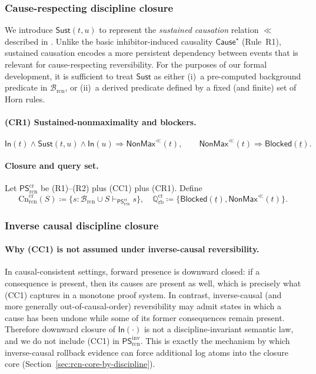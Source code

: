 \documentclass[twoside]{article}
\newcommand{\Cn}{\mathrm{Cn}}
\newcommand{\1}{\mathbf{1}}
\begin{document}
\subsubsection{Cause-respecting discipline closure}
\label{sec:rcn-cause-respecting-closure}

We introduce \(\mathsf{Sust}(t,u)\) to represent the \emph{sustained causation} relation \(\ll\) described in \cite{melgratti2024reversible}.
Unlike the basic inhibitor-induced causality \(\mathsf{Cause}^\star\) (Rule~R1), sustained causation encodes a more persistent dependency between events that is relevant for cause-respecting reversibility.
For the purposes of our formal development, it is sufficient to treat \(\mathsf{Sust}\) as either
(i)~a pre-computed background predicate in \(\mathcal{B}_{\mathrm{rcn}}\), or
(ii)~a derived predicate defined by a fixed (and finite) set of Horn rules.

\paragraph{(CR1) Sustained-nonmaximality and blockers.}
\[
\mathsf{In}(t)\wedge \mathsf{Sust}(t,u)\wedge \mathsf{In}(u)\Rightarrow \mathsf{NonMax}^{\ll}(t),
\qquad
\mathsf{NonMax}^{\ll}(t)\Rightarrow \mathsf{Blocked}(\underline{t}).
\]

\paragraph{Closure and query set.}
Let \(\mathsf{PS}^{\mathrm{cr}}_{\mathrm{rcn}}\) be (R1)--(R2) plus (CC1) plus (CR1).
Define
\[
\Cn^{\mathrm{cr}}_{\mathrm{rcn}}(S)\coloneqq \{s:\mathcal{B}_{\mathrm{rcn}}\cup S\vdash_{\mathsf{PS}^{\mathrm{cr}}_{\mathrm{rcn}}} s\},
\quad
\mathbb{Q}^{\mathrm{cr}}_{\mathrm{rb}}\coloneqq \{\mathsf{Blocked}(\underline{t}),\mathsf{NonMax}^{\ll}(t)\}.
\]

\subsubsection{Inverse causal discipline closure}
\label{sec:rcn-inverse-causal-closure}

\paragraph{Why (CC1) is not assumed under inverse-causal reversibility.}
In causal-consistent settings, forward presence is downward closed: if a consequence is present, then its causes are present as well,
which is precisely what (CC1) captures in a monotone proof system.
In contrast, inverse-causal (and more generally out-of-causal-order) reversibility may admit states in which a cause has been undone
while some of its former consequences remain present.
Therefore downward closure of \(\mathsf{In}(\cdot)\) is not a discipline-invariant semantic law, and we do not include (CC1) in
\(\mathsf{PS}^{\mathrm{inv}}_{\mathrm{rcn}}\).
This is exactly the mechanism by which inverse-causal rollback evidence can force additional log atoms into the closure core
(Section~\ref{sec:rcn-core-by-discipline}).
\end{document}
